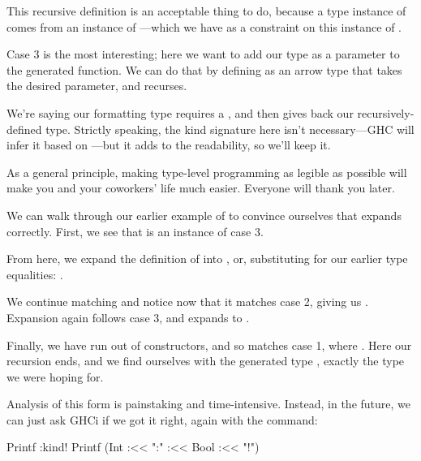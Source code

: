 \documentclass[book.tex]{subfiles}
\begin{document}

This recursive definition is an acceptable thing to do, because a type instance
of  comes from an instance of ---which we have as a
constraint on this instance of .

Case 3 is the most interesting; here we want to add our  type as a
parameter to the generated function. We can do that by defining  as
an arrow type that takes the desired parameter, and recurses.


We're saying our formatting type requires a , and then gives back our
recursively-defined  type. Strictly speaking, the  kind
signature here isn't necessary---GHC will infer it based on ---but it adds to the readability, so we'll keep it.

As a general principle, making type-level programming as legible as possible
will make you and your coworkers' life much easier. Everyone will thank you
later.

We can walk through our earlier example of  to
convince ourselves that  expands correctly. First, we see that
 is an instance of case 3.

From here, we expand the definition of  into , or, substituting for our earlier type equalities: .

We continue matching  and notice now that it
matches case 2, giving us . Expansion again
follows case 3, and expands to .

Finally, we have run out of \ty{(:<<)} constructors, and so 
matches case 1, where . Here our recursion ends, and we
find ourselves with the generated type , exactly the
type we were hoping for.

Analysis of this form is painstaking and time-intensive. Instead, in the future,
we can just ask GHCi if we got it right, again with the 
command:

\begin{dorepl}{Printf}
:kind! Printf (Int :<< ":" :<< Bool :<< "!")
\end{dorepl}
\end{document}
